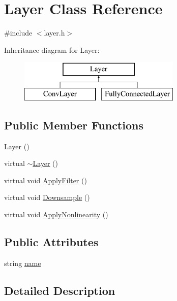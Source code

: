 \hypertarget{class_layer}{\section{Layer Class Reference}
\label{class_layer}
}


{\ttfamily \#include $<$layer.\+h$>$}

Inheritance diagram for Layer\+:\begin{figure}[H]
\begin{center}
\leavevmode
\includegraphics[height=2.000000cm]{class_layer}
\end{center}
\end{figure}
\subsection*{Public Member Functions}
\begin{DoxyCompactItemize}
\item 
\hyperlink{class_layer_a8f623c7c4737dc29ecc86978d243ac6f}{Layer} ()
\item 
virtual \hyperlink{class_layer_a2bac093f2a650095a5551fc455d10dc5}{$\sim$\+Layer} ()
\item 
virtual void \hyperlink{class_layer_acb52658f0eb1ec6f693dae392667d699}{Apply\+Filter} ()
\item 
virtual void \hyperlink{class_layer_aa351b47cff9c43788aabfd32bfc54176}{Downsample} ()
\item 
virtual void \hyperlink{class_layer_aab2270f2a6793112a8fa5aefe33eed1e}{Apply\+Nonlinearity} ()
\end{DoxyCompactItemize}
\subsection*{Public Attributes}
\begin{DoxyCompactItemize}
\item 
string \hyperlink{class_layer_ad7b365801548fd195fb0e1d48627f2f6}{name}
\end{DoxyCompactItemize}


\subsection{Detailed Description}


